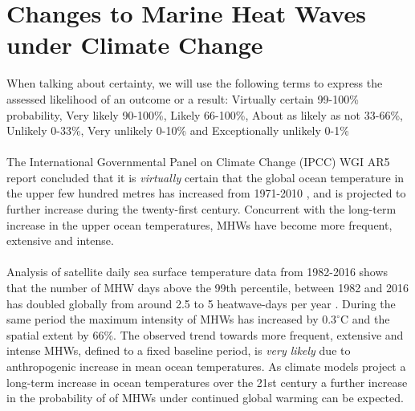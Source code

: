 \section{Changes to Marine Heat Waves under Climate Change}
When talking about certainty, we will use the following terms to express the assessed likelihood of an outcome or a result: Virtually certain 99-100\% probability, Very likely 90-100\%, Likely 66-100\%, About as likely as not 33-66\%, Unlikely 0-33\%, Very unlikely 0-10\% and Exceptionally unlikely 0-1\%
\\\\
The International Governmental Panel on Climate Change (IPCC) WGI AR5 report concluded that it is \textit{virtually} certain that the global ocean temperature in the upper few hundred metres has increased from 1971-2010 \cite{AR5}, and is projected to further increase during the twenty-first century. \cite{collins2013long} Concurrent with the long-term increase in the upper ocean temperatures, MHWs have become more frequent, extensive and intense. \cite{1,2,3}
\\\\
Analysis of satellite daily sea surface temperature data from 1982-2016 shows that the number of MHW days above the 99th percentile, between 1982 and 2016 has doubled globally from around 2.5 to 5 heatwave-days per year \cite{1,2}. During the same period the maximum intensity of MHWs has increased by $0.3^\circ$C and the spatial extent by 66\%. \cite{1} The observed trend towards more frequent, extensive and intense MHWs, defined to a fixed baseline period, is \textit{very likely} due to anthropogenic increase in mean ocean temperatures. \cite{1,2,3} As climate models project a long-term increase in ocean temperatures over the 21st century \cite{collins2013long} a further increase in the probability of of MHWs under continued global warming can be expected. \cite{IPCC2019}
\\\\